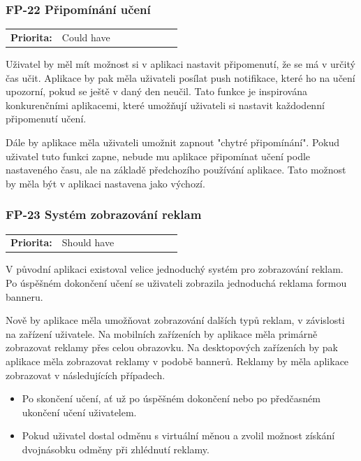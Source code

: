 \subsubsection{FP-22 Připomínání učení}

\begin{tabular}{lp{0.7\linewidth}}
    \textbf{Priorita:} & Could have \\
\end{tabular}


Uživatel by měl mít možnost si v aplikaci nastavit připomenutí, že se má v určitý čas učit. Aplikace by pak měla uživateli posílat push notifikace, které ho na učení upozorní, pokud se ještě v daný den neučil. Tato funkce je inspirována konkurenčními aplikacemi, které umožňují uživateli si nastavit každodenní připomenutí učení.

Dále by aplikace měla uživateli umožnit zapnout "chytré připomínání". Pokud uživatel tuto funkci zapne, nebude mu aplikace připomínat učení podle nastaveného času, ale na základě předchozího používání aplikace. Tato možnost by měla být v aplikaci nastavena jako výchozí.

\subsubsection{FP-23 Systém zobrazování reklam}\label{sec:fp-advertisement}

\begin{tabular}{lp{0.7\linewidth}}
    \textbf{Priorita:} & Should have \\
\end{tabular}

V původní aplikaci existoval velice jednoduchý systém pro zobrazování reklam. Po úspěšném dokončení učení se uživateli zobrazila jednoduchá reklama formou banneru.  

Nově by aplikace měla umožňovat zobrazování dalších typů reklam, v závislosti na zařízení uživatele. Na mobilních zařízeních by aplikace měla primárně zobrazovat reklamy přes celou obrazovku. Na desktopových zařízeních by pak aplikace měla zobrazovat reklamy v podobě bannerů. Reklamy by měla aplikace zobrazovat v následujících případech.

\begin{itemize}
    \item Po skončení učení, ať už po úspěšném dokončení nebo po předčasném ukončení učení uživatelem.
    \item Pokud uživatel dostal odměnu s virtuální měnou a zvolil možnost získání dvojnásobku odměny při zhlédnutí reklamy.
\end{itemize}

